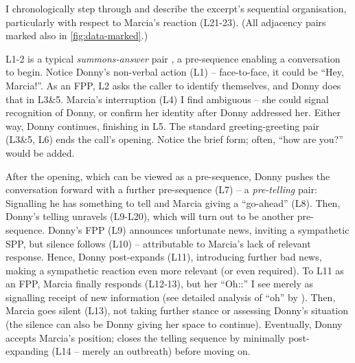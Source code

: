 \documentclass[11pt]{article}
\begin{document}
{	%
	I chronologically step through and describe the excerpt's sequential organisation, particularly with respect to Marcia's reaction (L21-23). (All adjacency pairs marked also in \autoref{fig:data-marked}.)

	L1-2 is a typical \textit{summons-answer} pair \citep[p.~126]{Liddicoat_2007}, a pre-sequence enabling a conversation to begin. Notice Donny's non-verbal action (L1) -- face-to-face, it could be ``Hey, Marcia!''.
	As an FPP, L2 asks the caller to identify themselves, and Donny does that in L3\&5.
	Marcia's interruption (L4) I find ambiguous -- she could signal recognition of Donny, or confirm her identity after Donny addressed her. Either way, Donny continues, finishing in L5.
	The standard greeting-greeting pair (L3\&5, L6) ends the call's opening. Notice the brief form; often, ``how are you?'' would be added.

	After the opening, which can be viewed as a pre-sequence, Donny pushes the conversation forward with a further pre-sequence (L7) -- a \textit{pre-telling} \citep[p.~136]{Liddicoat_2007} pair: Signalling he has something to tell and Marcia giving a ``go-ahead'' (L8).
	Then, Donny's telling unravels (L9-L20), which will turn out to be another pre-sequence.
	Donny's FPP (L9) announces unfortunate news, inviting a sympathetic SPP, but silence follows (L10) -- attributable to Marcia's lack of relevant response.
	Hence, Donny post-expands (L11), introducing further bad news, making a sympathetic reaction even more relevant (or even required).
	To L11 as an FPP, Marcia finally responds (L12-13), but her ``Oh::'' I see merely as signalling receipt of new information (see detailed analysis of ``oh'' by \citet{Heritage_1984}). Then, Marcia goes silent (L13), not taking further stance or assessing Donny's situation (the silence can also be Donny giving her space to continue).
	Eventually,	Donny accepts Marcia's position; closes the telling sequence by minimally post-expanding (L14 -- merely an outbreath) before moving on.

}
\end{document}

